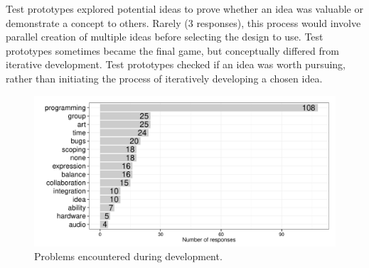 \documentclass{sig-alternate}
\begin{document}
Test prototypes explored potential ideas to prove whether an idea was valuable or demonstrate a concept to others. Rarely (3 responses), this process would involve parallel creation of multiple ideas before selecting the design to use. 
Test prototypes sometimes became the final game, but conceptually differed from iterative development. 
Test prototypes checked if an idea was worth pursuing, rather than initiating the process of iteratively developing a chosen idea.


\begin{figure}[tbph]
\centering
\includegraphics[width=\linewidth]{./problem}
\caption{Problems encountered during development.}
\label{fig:problem}
\end{figure}
\end{document}
